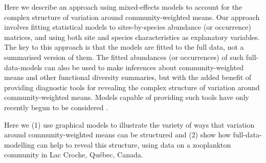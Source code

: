\documentclass[12pt]{ecology}
\begin{document}
Here we describe an approach using mixed-effects models to account for the complex structure of variation around community-weighted means.  Our approach involves fitting statistical models to sites-by-species abundance (or occurrence) matrices, and using both site and species characteristics as explanatory variables.  The key to this approach is that the models are fitted to the full data, not a summarised version of them.  The fitted abundances (or occurrences) of such full-data-models can also be used to make inferences about community-weighted means and other functional diversity summaries, but with the added benefit of providing diagnostic tools for revealing the complex structure of variation around community-weighted means.  Models capable of providing such tools have only recently begun to be considered \citetext{e.g. \citealp{WebbEtAl2010, CormontEtAl2011, IvesAndHelmus2011, PollockEtAl2012, JamilEtAl2012}}.

Here we (1) use graphical models to illustrate the variety of ways that variation around community-weighted means can be structured and (2) show how full-data-modelling can help to reveal this structure, using data on a zooplankton community in Lac Croche, Qu\'{e}bec, Canada.









\end{document}
